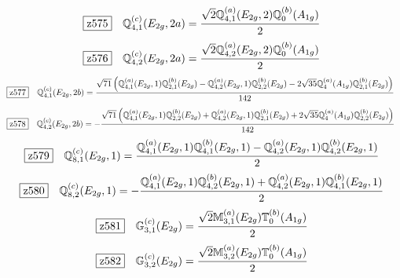 \documentclass[fleqn,10pt,landscape]{jsarticle}
\begin{document}
\begin{dmath*}
\hspace*{3mm}\fbox{z575}\quad \mathbb{Q}_{4,1}^{(c)}(E_{2g},2a)=\frac{\sqrt{2} \mathbb{Q}_{4,1}^{(a)}(E_{2g},2) \mathbb{Q}_{0}^{(b)}(A_{1g})}{2}
\end{dmath*}
\begin{dmath*}
\hspace*{3mm}\fbox{z576}\quad \mathbb{Q}_{4,2}^{(c)}(E_{2g},2a)=\frac{\sqrt{2} \mathbb{Q}_{4,2}^{(a)}(E_{2g},2) \mathbb{Q}_{0}^{(b)}(A_{1g})}{2}
\end{dmath*}
\begin{dmath*}
\hspace*{3mm}\fbox{z577}\quad \mathbb{Q}_{4,1}^{(c)}(E_{2g},2b)=\frac{\sqrt{71} \left(\mathbb{Q}_{4,1}^{(a)}(E_{2g},1) \mathbb{Q}_{2,1}^{(b)}(E_{2g}) - \mathbb{Q}_{4,2}^{(a)}(E_{2g},1) \mathbb{Q}_{2,2}^{(b)}(E_{2g}) - 2 \sqrt{35} \mathbb{Q}_{4}^{(a)}(A_{1g}) \mathbb{Q}_{2,1}^{(b)}(E_{2g})\right)}{142}
\end{dmath*}
\begin{dmath*}
\hspace*{3mm}\fbox{z578}\quad \mathbb{Q}_{4,2}^{(c)}(E_{2g},2b)=- \frac{\sqrt{71} \left(\mathbb{Q}_{4,1}^{(a)}(E_{2g},1) \mathbb{Q}_{2,2}^{(b)}(E_{2g}) + \mathbb{Q}_{4,2}^{(a)}(E_{2g},1) \mathbb{Q}_{2,1}^{(b)}(E_{2g}) + 2 \sqrt{35} \mathbb{Q}_{4}^{(a)}(A_{1g}) \mathbb{Q}_{2,2}^{(b)}(E_{2g})\right)}{142}
\end{dmath*}
\begin{dmath*}
\hspace*{3mm}\fbox{z579}\quad \mathbb{Q}_{8,1}^{(c)}(E_{2g},1)=\frac{\mathbb{Q}_{4,1}^{(a)}(E_{2g},1) \mathbb{Q}_{4,1}^{(b)}(E_{2g},1) - \mathbb{Q}_{4,2}^{(a)}(E_{2g},1) \mathbb{Q}_{4,2}^{(b)}(E_{2g},1)}{2}
\end{dmath*}
\begin{dmath*}
\hspace*{3mm}\fbox{z580}\quad \mathbb{Q}_{8,2}^{(c)}(E_{2g},1)=- \frac{\mathbb{Q}_{4,1}^{(a)}(E_{2g},1) \mathbb{Q}_{4,2}^{(b)}(E_{2g},1) + \mathbb{Q}_{4,2}^{(a)}(E_{2g},1) \mathbb{Q}_{4,1}^{(b)}(E_{2g},1)}{2}
\end{dmath*}
\begin{dmath*}
\hspace*{3mm}\fbox{z581}\quad \mathbb{G}_{3,1}^{(c)}(E_{2g})=\frac{\sqrt{2} \mathbb{M}_{3,1}^{(a)}(E_{2g}) \mathbb{T}_{0}^{(b)}(A_{1g})}{2}
\end{dmath*}
\begin{dmath*}
\hspace*{3mm}\fbox{z582}\quad \mathbb{G}_{3,2}^{(c)}(E_{2g})=\frac{\sqrt{2} \mathbb{M}_{3,2}^{(a)}(E_{2g}) \mathbb{T}_{0}^{(b)}(A_{1g})}{2}
\end{dmath*}
\end{document}
